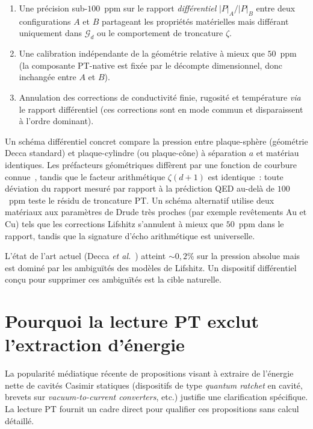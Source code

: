 \documentclass[11pt,a4paper]{article}
\begin{document}
\begin{enumerate}
  \item Une précision sub-$100$~ppm sur le rapport \emph{différentiel} $|P|_A/|P|_B$ entre
    deux configurations $A$ et $B$ partageant les propriétés matérielles mais différant
    uniquement dans $\mathcal{G}_d$ ou le comportement de troncature $\zeta$.
  \item Une calibration indépendante de la géométrie relative à mieux que $50$~ppm (la
    composante PT-native est fixée par le décompte dimensionnel, donc inchangée entre $A$ et $B$).
  \item Annulation des corrections de conductivité finie, rugosité et température \emph{via}
    le rapport différentiel (ces corrections sont en mode commun et disparaissent à l'ordre
    dominant).
\end{enumerate}

Un schéma différentiel concret compare la pression entre plaque-sphère (géométrie Decca
standard) et plaque-cylindre (ou plaque-cône) à séparation $a$ et matériau identiques. Les
préfacteurs géométriques diffèrent par une fonction de courbure connue~\cite{Mostepanenko2009},
tandis que le facteur arithmétique $\zeta(d+1)$ est identique~: toute déviation du rapport
mesuré par rapport à la prédiction QED au-delà de $100$~ppm teste le résidu de troncature PT.
Un schéma alternatif utilise deux matériaux aux paramètres de Drude très proches (par exemple
revêtements Au et Cu) tels que les corrections Lifshitz s'annulent à mieux que $50$~ppm dans
le rapport, tandis que la signature d'écho arithmétique est universelle.

L'état de l'art actuel (Decca \emph{et al.}~\cite{Decca2007}) atteint $\sim 0{,}2\%$ sur la
pression absolue mais est dominé par les ambiguïtés des modèles de Lifshitz. Un dispositif
différentiel conçu pour supprimer ces ambiguïtés est la cible naturelle.

\section{Pourquoi la lecture PT exclut l'extraction d'énergie}
\label{sec:no-extraction}

La popularité médiatique récente de propositions visant à extraire de l'énergie nette de cavités
Casimir statiques (dispositifs de type \emph{quantum ratchet} en cavité, brevets sur
\emph{vacuum-to-current converters}, etc.) justifie une clarification spécifique. La lecture PT
fournit un cadre direct pour qualifier ces propositions sans calcul détaillé.
\end{document}
